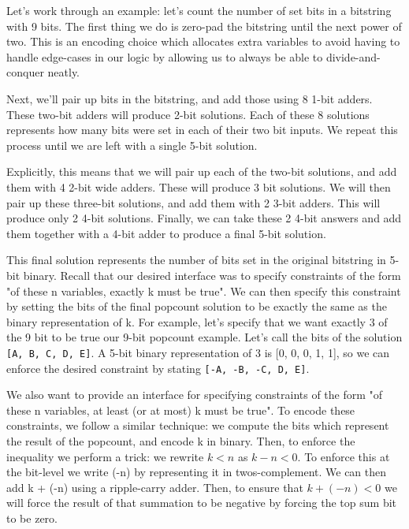 Let's work through an example: let's count the number of set bits in a bitstring with 9 bits. The first thing we do is zero-pad the bitstring until the next power of two. This is an encoding choice which allocates extra variables to avoid having to handle edge-cases in our logic by allowing us to always be able to divide-and-conquer neatly.

Next, we'll pair up bits in the bitstring, and add those using 8 1-bit adders. These two-bit adders will produce 2-bit solutions. Each of these 8 solutions represents how many bits were set in each of their two bit inputs. We repeat this process until we are left with a single 5-bit solution.

Explicitly, this means that we will pair up each of the two-bit solutions, and add them with 4 2-bit wide adders. These will produce 3 bit solutions. We will then pair up these three-bit solutions, and add them with 2 3-bit adders. This will produce only 2 4-bit solutions. Finally, we can take these 2 4-bit answers and add them together with a 4-bit adder to produce a final 5-bit solution.

This final solution represents the number of bits set in the original bitstring in 5-bit binary. Recall that our desired interface was to specify constraints of the form "of these n variables, exactly k must be true". We can then specify this constraint by setting the bits of the final popcount solution to be exactly the same as the binary representation of k. For example, let's specify that we want exactly 3 of the 9 bit to be true our 9-bit popcount example. Let's call the bits of the solution \texttt{[A, B, C, D, E]}. A 5-bit binary representation of 3 is [0, 0, 0, 1, 1], so we can enforce the desired constraint by stating \texttt{[-A, -B, -C, D, E]}.

We also want to provide an interface for specifying constraints of the form "of these n variables, at least (or at most) k must be true". To encode these constraints, we follow a similar technique: we compute the bits which represent the result of the popcount, and encode k in binary. Then, to enforce the inequality we perform a trick: we rewrite $ k < n $ as $ k - n < 0$. To enforce this at the bit-level we write (-n) by representing it in twos-complement. We can then add k + (-n) using a ripple-carry adder. Then, to ensure that $k + (-n) < 0$ we will force the result of that summation to be negative by forcing the top sum bit to be zero.
